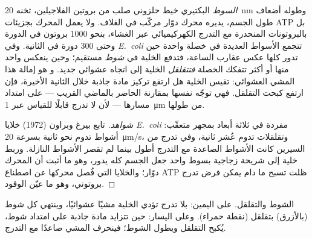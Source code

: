 \begin{proposition}\label{prop:b2:unicellular-diversity:flagellum}
\emph{السوط} البكتيري خيط حلزوني صلب من بروتين الفلاجيلين، ثخنه
\qty{20}{nm} وطوله أضعاف طول الجسم، يديره محرك دوّار مركّب في
الغلاف. ولا يعمل المحرك بجزيئات ATP بل بالبروتونات المنحدرة مع التدرج
الكهركيميائي عبر الغشاء، بنحو \num{1000} بروتون في الدورة وحتى
\num{300} دورة في الثانية. وفي \emph{E.~coli} تتجمع الأسواط العديدة
في خصلة واحدة حين تدور كلها عكس عقارب الساعة، فتدفع الخلية في
\emph{شوط} مستقيم؛ وحين ينعكس واحد منها أو أكثر تتفكك الخصلة
\emph{فتتقلقل} الخلية إلى اتجاه عشوائي جديد. و\emph{} هو إمالة هذا المشي العشوائي: تقيس الخلية هل ارتفع تركيز
مادة جاذبة خلال الثانية الأخيرة، فإن ارتفع كبحت التقلقل. فهي توجّه
نفسها بمقارنة الحاضر بالماضي القريب --- على امتداد مسارها --- لأن
لا تدرج قابلًا للقياس عبر \qty{1}{\micro m} من طولها.
\end{proposition}
\begin{proof}[شواهد]
تابع بيرغ وبراون (1972) خلايا \emph{E.~coli} مفردة في ثلاثة أبعاد
بمجهر متعقّب: أشواط تدوم نحو ثانية بسرعة \qty{20}{\micro m/s}،
وتقلقلات تدوم عُشر ثانية، وفي تدرج من السيرين كانت الأشواط الصاعدة
مع التدرج أطول بينما لم تقصر الأشواط النازلة. وربط خلية إلى شريحة
زجاجية بسوط واحد جعل الجسم كله يدور، وهو ما أثبت أن المحرك دوّار؛
والخلايا التي فُصل محركها عن اصطناع ATP ظلت تسبح ما دام يمكن فرض
تدرج بروتوني، وهو ما عيّن الوقود.
\end{proof}

\begin{omfigure}

{\small الشوط والتقلقل. على اليمين: بلا تدرج تؤدي الخلية مشيًا
عشوائيًا، وينتهي كل شوط (بالأزرق) بتقلقل (نقطة حمراء). وعلى
اليسار: حين تتزايد مادة جاذبة على امتداد شوط، يُكبح التقلقل ويطول
الشوط؛ فينحرف المشي صاعدًا مع التدرج.}
\end{omfigure}

